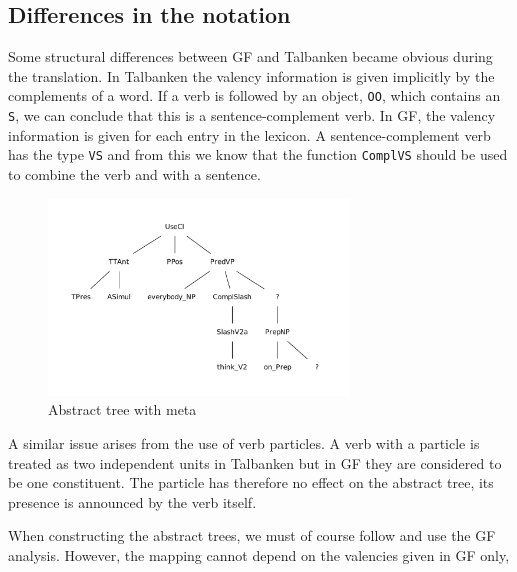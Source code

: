 \documentclass{report}
\begin{document}
\subsection{Differences in the notation}
Some structural differences between GF and Talbanken became obvious during the
translation.
In Talbanken the valency information is given implicitly by the complements
of a word. If a verb is followed by an object, \verb-OO-, which contains an
\verb-S-, we can conclude that this is a sentence-complement verb.
In GF, the valency information is given for each entry in the lexicon.
A sentence-complement verb has the type \verb-VS- and from this we know 
that the function \verb-ComplVS- should be used to combine the verb and with a 
sentence.
\begin{figure}
\includegraphics[width=80mm]{metatree.pdf}
\caption{Abstract tree with meta}
\label{pic:gMetatree}
\end{figure}

A similar issue arises from the use of verb particles. A verb with a
particle is treated as two independent units in Talbanken but in GF they are
considered to be one constituent. %
The particle has therefore no effect on the abstract tree, its presence is
announced by the verb itself.

When constructing the abstract trees, we must of course follow and use the
GF analysis. However,
the mapping cannot depend on the valencies given in GF only, 
\newpage
\end{document}
